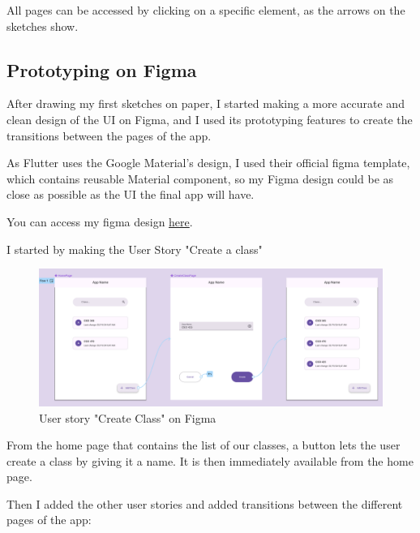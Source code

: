 \documentclass[]{article}
\begin{document}
	All pages can be accessed by clicking on a specific element, as the arrows on the sketches show.
	
	\pagebreak
	
	\subsection{Prototyping on Figma}
	
	After drawing my first sketches on paper, I started making a more accurate and clean design of the UI on Figma, and I used its prototyping features to create the transitions between the pages of the app.
	
	As Flutter uses the Google Material's design, I used their official figma template, which contains reusable Material component, so my Figma design could be as close as possible as the UI the final app will have.
	
	You can access my figma design \href{https://www.figma.com/file/ZOlxVGHb9fLdk5uUODqMU9/CSCI-337---Notes-Taking-App?type=design&node-id=54810%3A34721&mode=design&t=fS6KJvRgsvtgz9cf-1}{here}.
	
	I started by making the User Story "Create a class"
	
		\begin{figure}[!htb]
		\centering
		\includegraphics[scale=0.3]{figma_user_story_create_class}
		\caption{User story "Create Class" on Figma}
	\end{figure}
	
	From the home page that contains the list of our classes, a button lets the user create a class by giving it a name. It is then immediately available from the home page.
	
	\pagebreak
	
	Then I added the other user stories and added transitions between the different pages of the app:
	
\end{document}
